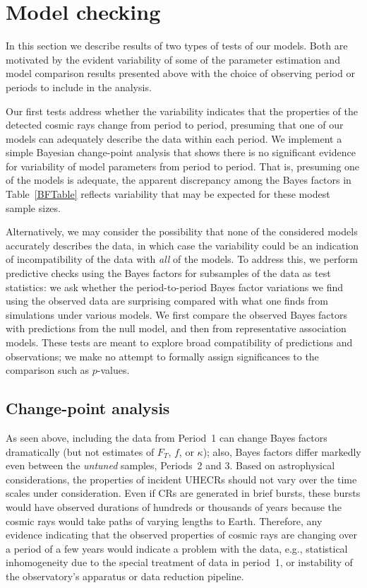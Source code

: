 \section{Model checking}\label{sec:checking}

In this section we describe results of two types of tests of our models.
Both are motivated by the evident variability of some of the parameter
estimation and model comparison results presented above with the choice of
observing period or periods to include in the analysis.

Our first tests address whether the variability indicates that the
properties of the detected cosmic rays change from period to period,
presuming that one of our models can adequately describe the data within
each period. We implement a simple Bayesian change-point analysis that shows
there is no significant evidence for variability of model parameters from
period to period.  That is, presuming one of the models is adequate, the
apparent discrepancy among the Bayes factors in Table~\ref{BFTable} reflects
variability that may be expected for these modest sample sizes.

Alternatively, we may consider the possibility that none of the considered
models accurately describes the data, in which case the variability could be
an indication of incompatibility of the data with {\em all} of the models.
To address this, we perform predictive checks using the Bayes factors for
subsamples of the data as test statistics:  we ask whether the
period-to-period Bayes factor variations we find using the observed data
are surprising compared with what one finds from simulations under various
models.  We first compare the observed Bayes factors with predictions from the
null model, and then from representative association models.  These tests
are meant to explore broad compatibility of predictions and
observations; we make no attempt to formally assign significances to the
comparison such as $p$-values.

\subsection{Change-point analysis}
\label{sec:difference_between_periods}

As seen above, including the data from Period~1 can change Bayes factors
dramatically (but not estimates of $F_T$, $f$, or $\kappa$); also, Bayes
factors differ markedly even between the {\em untuned} samples, Periods~2
and 3.  Based on astrophysical considerations, the properties of incident
UHECRs should not vary over the time scales under consideration.  Even if CRs
are generated in brief bursts, these bursts would have observed durations of
hundreds or thousands of years because the cosmic rays would take paths of
varying lengths to Earth.  Therefore, any evidence indicating that the
observed properties of cosmic rays are changing over a period of a few years
would indicate a problem with the data, e.g., statistical inhomogeneity due to
the special treatment of data in period~1, or instability of the observatory's
apparatus or data reduction pipeline.

